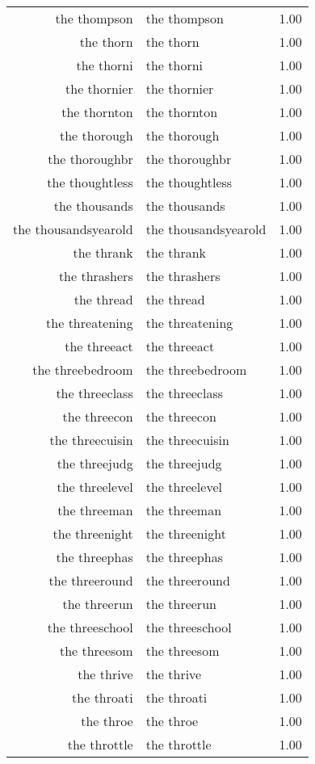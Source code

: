 \begin{table}[ht]
\begin{tabular}{rlr}
  the thompson & the thompson & 1.00 \\ 
  the thorn & the thorn & 1.00 \\ 
  the thorni & the thorni & 1.00 \\ 
  the thornier & the thornier & 1.00 \\ 
  the thornton & the thornton & 1.00 \\ 
  the thorough & the thorough & 1.00 \\ 
  the thoroughbr & the thoroughbr & 1.00 \\ 
  the thoughtless & the thoughtless & 1.00 \\ 
  the thousands & the thousands & 1.00 \\ 
  the thousandsyearold & the thousandsyearold & 1.00 \\ 
  the thrank & the thrank & 1.00 \\ 
  the thrashers & the thrashers & 1.00 \\ 
  the thread & the thread & 1.00 \\ 
  the threatening & the threatening & 1.00 \\ 
  the threeact & the threeact & 1.00 \\ 
  the threebedroom & the threebedroom & 1.00 \\ 
  the threeclass & the threeclass & 1.00 \\ 
  the threecon & the threecon & 1.00 \\ 
  the threecuisin & the threecuisin & 1.00 \\ 
  the threejudg & the threejudg & 1.00 \\ 
  the threelevel & the threelevel & 1.00 \\ 
  the threeman & the threeman & 1.00 \\ 
  the threenight & the threenight & 1.00 \\ 
  the threephas & the threephas & 1.00 \\ 
  the threeround & the threeround & 1.00 \\ 
  the threerun & the threerun & 1.00 \\ 
  the threeschool & the threeschool & 1.00 \\ 
  the threesom & the threesom & 1.00 \\ 
  the thrive & the thrive & 1.00 \\ 
  the throati & the throati & 1.00 \\ 
  the throe & the throe & 1.00 \\ 
  the throttle & the throttle & 1.00 \\ 

\end{tabular}
\end{table}
